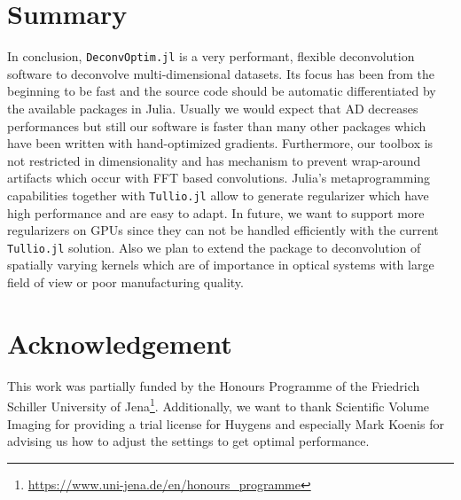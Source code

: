 \documentclass{juliacon}
\begin{document}
\section{Summary}
    In conclusion, \verb|DeconvOptim.jl| is a very performant, flexible deconvolution software to deconvolve multi-dimensional datasets.
    Its focus has been from the beginning to be fast and the source code should be automatic differentiated by the available
    packages in Julia. Usually we would expect that AD decreases performances but still our software is faster than
    many other packages which have been written with hand-optimized gradients.
    Furthermore, our toolbox is not restricted in dimensionality and has mechanism to prevent wrap-around artifacts which
    occur with FFT based convolutions.
    Julia's metaprogramming capabilities together with \verb|Tullio.jl| allow to generate regularizer which have high performance
    and are easy to adapt.
    In future, we want to support more regularizers on GPUs since they can not be handled efficiently with the current \verb|Tullio.jl| solution.
    Also we plan to extend the package to deconvolution of spatially varying kernels which are of importance in optical systems
    with large field of view or poor manufacturing quality.

\section{Acknowledgement}
    This work was partially funded by the Honours Programme of the Friedrich Schiller 
    University of Jena\footnote{\url{https://www.uni-jena.de/en/honours_programme}}. 
    Additionally, we want to thank Scientific Volume Imaging for providing a trial license for Huygens and especially Mark Koenis for advising
    us how to adjust the settings to get optimal performance. 


\end{document}
